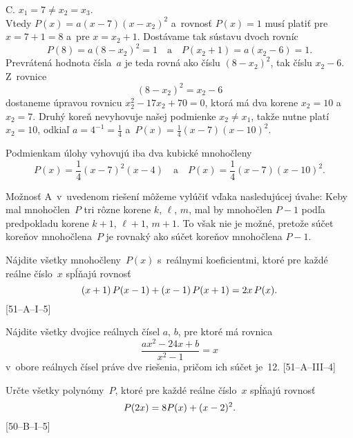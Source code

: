 {\item{C.} $x_1=7\ne x_2=x_3$.
\\
Vtedy $P(x)=a(x-7)(x-x_2)^2$ 
a~rovnosť $P(x)=1$ musí platiť pre $x=7+1=8$ a~pre $x=x_2+1$.
Dostávame tak sústavu dvoch rovníc
$$
P(8)=a(8-x_2)^2=1\quad\text{a}\quad P(x_2+1)=a(x_2-6)=1.
$$
Prevrátená hodnota čísla~$a$ je teda rovná ako číslu $(8-x_2)^2$,
tak číslu $x_2-6$. Z~rovnice
$$
(8-x_2)^2=x_2-6
$$
dostaneme úpravou rovnicu $x_2^2-17x_2+70=0$, ktorá má dva korene
$x_2=10$ a~$x_2=7$. Druhý koreň nevyhovuje našej podmienke $x_2\ne
x_1$, takže nutne platí $x_2=10$, odkiaľ $a=4^{-1}=\frac14$ 
a~$P(x)=\frac14(x-7)(x-10)^2$.

\zaver
Podmienkam úlohy vyhovujú iba dva kubické mnohočleny
$$
P(x)=\frac14(x-7)^2(x-4)\quad\text{a}\quad P(x)=\frac14(x-7)(x-10)^2.
$$

\poznamka
Možnosť A~v~uvedenom riešení môžeme vylúčiť vďaka nasledujúcej
úvahe:
Keby mal mnohočlen~$P$ tri rôzne korene $k$, $\ell$, $m$, mal by
mnohočlen $P-1$ podľa predpokladu korene $k+1$, $\ell+1$, $m+1$. To
však nie je možné, pretože súčet koreňov mnohočlena~$P$ je rovnaký
ako súčet koreňov mnohočlena $P-1$.


Nájdite všetky mnohočleny~$P(x)$ s~reálnymi koeficientmi,
ktoré pre každé reálne číslo~$x$ spĺňajú rovnosť
$$
\postdisplaypenalty 10000
(x+1)\, P(x-1)+(x-1)\, P(x+1)=2x\, P(x).
$$
[51--A--I--5]

Nájdite všetky dvojice reálnych čísel $a$, $b$, pre
ktoré má rovnica
$$
\frac{ax^2-24x+b}{x^2-1}=x
$$
v~obore reálnych čísel práve dve riešenia, pričom ich súčet je~12.
[51--A--III--4]

Určte všetky polynómy~$P$, ktoré pre každé reálne číslo~$x$
spĺňajú rovnosť
$$
\postdisplaypenalty 10000
P(2x)=8P(x)+(x-2)^2.
$$
[50--B--I--5]

}
